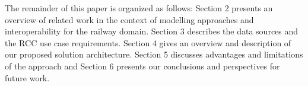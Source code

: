 The remainder of this paper is organized as follows:
Section 2 presents an overview of related work in the context
of modelling approaches and interoperability for the railway domain.
Section 3 describes the data sources and the RCC use case requirements.
Section 4 gives an overview and description
of our proposed solution architecture.
Section 5 discusses advantages and limitations of the approach
and Section 6 presents our conclusions and perspectives for future work.